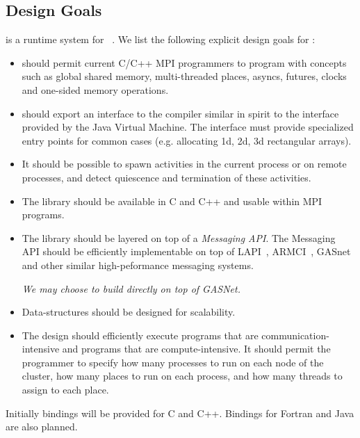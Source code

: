 \subsection{Design Goals}
\Xtenlib{} is a runtime system for \Xten{}~\cite{x10}. 
We list the following explicit design goals for \Xtenlib:
\begin{itemize}
{}\item \Xtenlib{} should permit current C/C++ MPI programmers to
 program with \Xten{} concepts such as global shared memory,
 multi-threaded places, asyncs, futures, clocks and one-sided memory
 operations.

 {}\item \Xtenlib{} should export an interface to the compiler
 similar in spirit to the interface provided by the Java Virtual
 Machine. The interface must provide specialized entry points for
 common cases (e.g.{} allocating 1d, 2d, 3d rectangular arrays).

\item It should be possible to spawn activities in the current 
  process or on remote processes, and detect quiescence and
  termination of these activities.

{}\item The library should be available in C and C++ and usable within
MPI programs.

{}\item The library should be layered on top of a {\em Messaging API}.
  The Messaging API should be efficiently implementable on top of
  LAPI~\cite{lapi}, ARMCI~\cite{armci}, GASnet~\cite{gasnet} and other
  similar high-peformance messaging systems.

  {\em We may choose to build directly on top of GASNet.}

\item Data-structures should be designed for scalability.

\item The design should efficiently execute programs that are 
 communication-intensive and programs that are compute-intensive. It
 should permit the programmer to specify how many processes to run on
 each node of the cluster, how many places to run on each process, and
 how many threads to assign to each place.
\end{itemize}
Initially bindings will be provided for C and C++. Bindings for Fortran
and Java are also planned.

